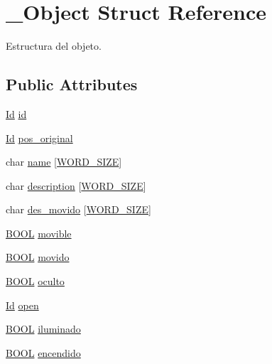 \hypertarget{struct__Object}{\section{\+\_\+\+Object Struct Reference}
\label{struct__Object}
}


Estructura del objeto.  


\subsection*{Public Attributes}
\begin{DoxyCompactItemize}
\item 
\hyperlink{types_8h_a845e604fb28f7e3d97549da3448149d3}{Id} \hyperlink{struct__Object_a3cff7a0e8dc4e9d23895ed9af1b7653a}{id}
\item 
\hyperlink{types_8h_a845e604fb28f7e3d97549da3448149d3}{Id} \hyperlink{struct__Object_a42b5cf094a2df1756303245ea70dbb55}{pos\+\_\+original}
\item 
char \hyperlink{struct__Object_a3dab853826b88558a2c07dec50b96d57}{name} \mbox{[}\hyperlink{types_8h_a92ed8507d1cd2331ad09275c5c4c1c89}{W\+O\+R\+D\+\_\+\+S\+I\+Z\+E}\mbox{]}
\item 
char \hyperlink{struct__Object_a556e2e37c1461bcaae6492d2101f407d}{description} \mbox{[}\hyperlink{types_8h_a92ed8507d1cd2331ad09275c5c4c1c89}{W\+O\+R\+D\+\_\+\+S\+I\+Z\+E}\mbox{]}
\item 
char \hyperlink{struct__Object_a786e4c903e42b20ed785fbe4372941e0}{des\+\_\+movido} \mbox{[}\hyperlink{types_8h_a92ed8507d1cd2331ad09275c5c4c1c89}{W\+O\+R\+D\+\_\+\+S\+I\+Z\+E}\mbox{]}
\item 
\hyperlink{types_8h_a3e5b8192e7d9ffaf3542f1210aec18dd}{B\+O\+O\+L} \hyperlink{struct__Object_a182b654831db35840643f7ac44dba937}{movible}
\item 
\hyperlink{types_8h_a3e5b8192e7d9ffaf3542f1210aec18dd}{B\+O\+O\+L} \hyperlink{struct__Object_aa2e3f6d7b7b8e2ed9b42b550650dd1e5}{movido}
\item 
\hyperlink{types_8h_a3e5b8192e7d9ffaf3542f1210aec18dd}{B\+O\+O\+L} \hyperlink{struct__Object_ae80a5867852e78b0c158844c280b2d5a}{oculto}
\item 
\hyperlink{types_8h_a845e604fb28f7e3d97549da3448149d3}{Id} \hyperlink{struct__Object_a0922dd9891e6aa617ce1d51ae27c0175}{open}
\item 
\hyperlink{types_8h_a3e5b8192e7d9ffaf3542f1210aec18dd}{B\+O\+O\+L} \hyperlink{struct__Object_afcf4d46d3327646477e5e70bb0535653}{iluminado}
\item 
\hyperlink{types_8h_a3e5b8192e7d9ffaf3542f1210aec18dd}{B\+O\+O\+L} \hyperlink{struct__Object_a69dc115b72581c6618dd7c0d860d4c04}{encendido}
\end{DoxyCompactItemize}


